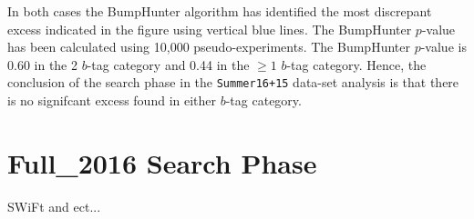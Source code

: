 In both cases the BumpHunter algorithm has identified the most discrepant excess indicated
in the figure using vertical blue lines.
The BumpHunter $p$-value has been calculated using 10,000 pseudo-experiments.
The BumpHunter $p$-value is 0.60 in the 2 $b$-tag category
and 0.44 in the $\geq1$ $b$-tag category.
Hence, the conclusion of the search phase in the \verb|Summer16+15| data-set analysis
is that there is no signifcant excess found in either $b$-tag category.


\section{Full\_2016 Search Phase}
\label{sec:bkg-full}

SWiFt and ect...
